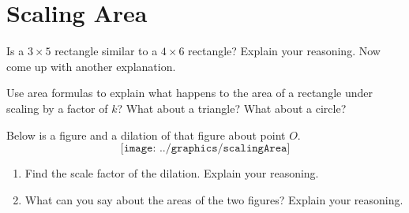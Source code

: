 \newpage
\section{Scaling Area}


\begin{prob}
Is a $3\times 5$ rectangle similar to a $4\times 6$ rectangle?  Explain your reasoning.  Now come up with another explanation. 
\end{prob}

\vspace{.5in} 

\begin{prob}
Use area formulas to explain what happens to the area of a rectangle under scaling by a factor of $k$?  What about a triangle?  What about a circle?  
\end{prob}

\begin{prob}
Below is a figure and a dilation of that figure about point $O$.  
$$\texttt{[image: ../graphics/scalingArea]}$$
\begin{enumerate}
\item Find the scale factor of the dilation.  Explain your reasoning. 
\item What can you say about the areas of the two figures?  Explain your reasoning. 
\end{enumerate}
\end{prob}



